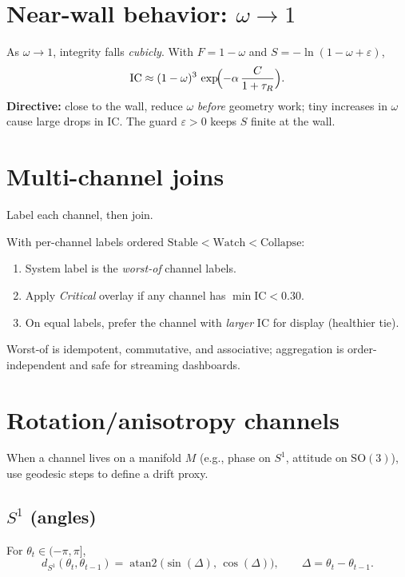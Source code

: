 \section{Near-wall behavior: $\omega\to 1$}
As $\omega\to1$, integrity falls \emph{cubicly}. With $F=1-\omega$ and $S=-\ln(1-\omega+\varepsilon)$,
\[
\mathrm{IC} \approx (1-\omega)^3\,\exp\!\Bigl(-\alpha\,\frac{C}{1+\tau_R}\Bigr).
\]
\textbf{Directive:} close to the wall, reduce $\omega$ \emph{before} geometry work; tiny increases in $\omega$ cause large drops in $\mathrm{IC}$. The guard $\varepsilon>0$ keeps $S$ finite at the wall.

\section{Multi-channel joins}
Label each channel, then join.
\begin{definition}
With per-channel labels ordered $\text{Stable} < \text{Watch} < \text{Collapse}$:
\begin{enumerate}[leftmargin=1.8em]
  \item System label is the \emph{worst-of} channel labels.
  \item Apply \emph{Critical} overlay if any channel has $\min\mathrm{IC}<0.30$.
  \item On equal labels, prefer the channel with \emph{larger} $\mathrm{IC}$ for display (healthier tie).
\end{enumerate}
\end{definition}

\begin{remark}
Worst-of is idempotent, commutative, and associative; aggregation is order-independent and safe for streaming dashboards.
\end{remark}

\section{Rotation/anisotropy channels}
When a channel lives on a manifold $M$ (e.g., phase on $S^1$, attitude on $\mathrm{SO}(3)$), use geodesic steps to define a drift proxy.

\subsection*{$S^1$ (angles)}
For $\theta_t\in(-\pi,\pi]$,
\[
d_{S^1}(\theta_t,\theta_{t-1})
  = \operatorname{atan2}\!\bigl(\sin(\Delta),\,\cos(\Delta)\bigr),
  \qquad \Delta = \theta_t - \theta_{t-1}.
\]

